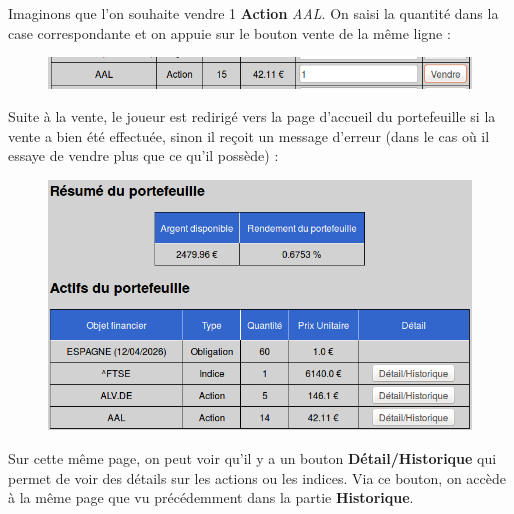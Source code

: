 \begin{enumerate}
      Imaginons que l'on souhaite vendre 1 \textbf{Action} \textit{AAL}. On saisi la quantité dans la case correspondante et on appuie sur le bouton vente de la même ligne :
      \begin{figure}[H]
	\center
	\includegraphics[scale=0.5]{../graph/7-vente1action.png}
      \end{figure}
      
      Suite à la vente, le joueur est redirigé vers la page d'accueil du portefeuille si la vente a bien été effectuée, sinon il reçoit un message d'erreur (dans le cas où il essaye de vendre plus que ce qu'il possède) :
      \begin{figure}[H]
	\center
	\includegraphics[scale=0.5]{../graph/7-accueilapresvente.png}
      \end{figure}
      Sur cette même page, on peut voir qu'il y a un bouton \textbf{Détail/Historique} qui permet de voir des détails sur les actions ou les indices. Via ce bouton, on accède à la même page que vu précédemment dans la partie \textbf{Historique}.
	

\end{enumerate}
